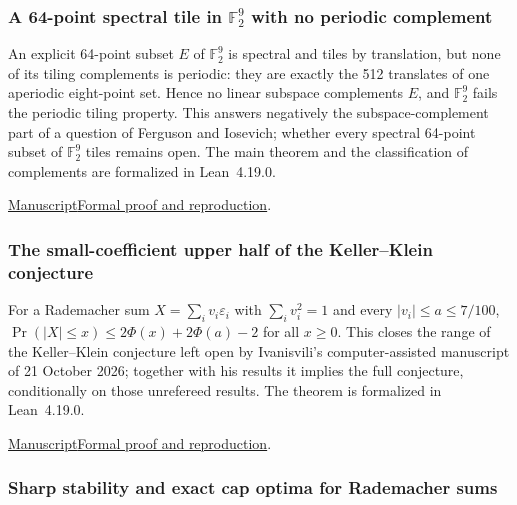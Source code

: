 \documentclass[11pt,a4paper]{article}
\begin{document}
\subsubsection{A 64-point spectral tile in $\mathbb{F}_2^9$ with no periodic complement}

An explicit 64-point subset $E$ of $\mathbb{F}_2^9$ is spectral and tiles by translation, but none of its tiling complements is periodic: they are exactly the 512 translates of one aperiodic eight-point set. Hence no linear subspace complements $E$, and $\mathbb{F}_2^9$ fails the periodic tiling property. This answers negatively the subspace-complement part of a question of Ferguson and Iosevich; whether every spectral 64-point subset of $\mathbb{F}_2^9$ tiles remains open. The main theorem and the classification of complements are formalized in Lean~4.19.0.

\noindent\href{https://github.com/dvgyl/math-and-theory/blob/main/papers/mathematics/binary-spectral-tile/manuscript.pdf}{Manuscript}\quad\href{https://github.com/dvgyl/math-and-theory/blob/main/papers/mathematics/binary-spectral-tile/README.md}{Formal proof and reproduction}.

\subsubsection{The small-coefficient upper half of the Keller--Klein conjecture}

For a Rademacher sum $X=\sum_i v_i\varepsilon_i$ with $\sum_i v_i^2=1$ and every $|v_i|\le a\le 7/100$, $\Pr(|X|\le x)\le 2\Phi(x)+2\Phi(a)-2$ for all $x\ge0$. This closes the range of the Keller--Klein conjecture left open by Ivanisvili's computer-assisted manuscript of 21 October 2026; together with his results it implies the full conjecture, conditionally on those unrefereed results. The theorem is formalized in Lean~4.19.0.

\noindent\href{https://github.com/dvgyl/math-and-theory/blob/main/papers/mathematics/keller-klein/manuscript.pdf}{Manuscript}\quad\href{https://github.com/dvgyl/math-and-theory/blob/main/papers/mathematics/keller-klein/README.md}{Formal proof and reproduction}.

\subsubsection{Sharp stability and exact cap optima for Rademacher sums}
\end{document}
